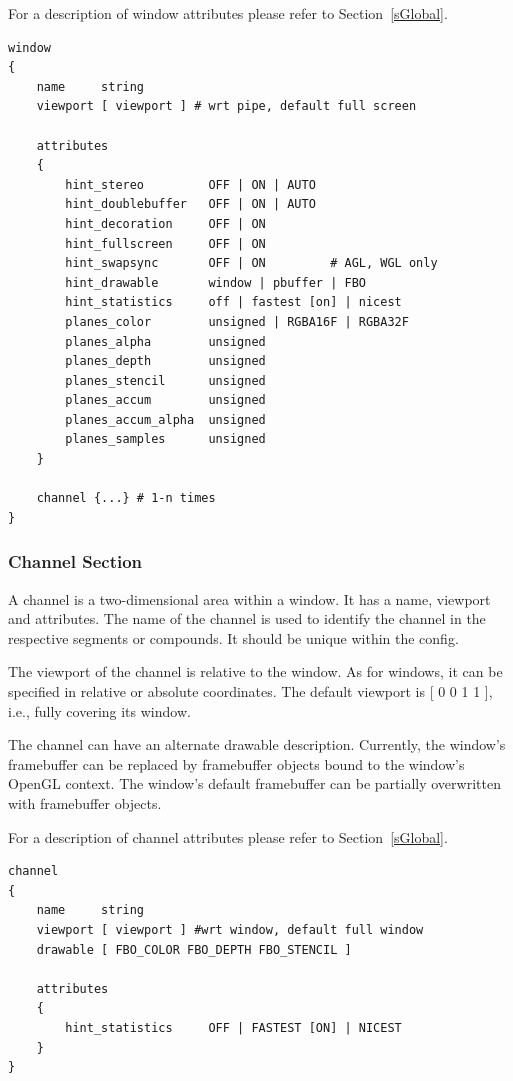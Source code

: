 \documentclass[10pt,a4]{scrartcl}
\newcommand{\sref}[1]{Section~\ref{#1}}
\begin{document}
For a description of window attributes please refer to \sref{sGlobal}.

{\footnotesize\begin{lstlisting}
window
{
    name     string
    viewport [ viewport ] # wrt pipe, default full screen

    attributes
    {
        hint_stereo         OFF | ON | AUTO
        hint_doublebuffer   OFF | ON | AUTO
        hint_decoration     OFF | ON
        hint_fullscreen     OFF | ON
        hint_swapsync       OFF | ON         # AGL, WGL only
        hint_drawable       window | pbuffer | FBO
        hint_statistics     off | fastest [on] | nicest
        planes_color        unsigned | RGBA16F | RGBA32F
        planes_alpha        unsigned
        planes_depth        unsigned
        planes_stencil      unsigned
        planes_accum        unsigned
        planes_accum_alpha  unsigned
        planes_samples      unsigned
    }

    channel {...} # 1-n times
}
\end{lstlisting}}

\subsubsection{Channel Section}

A channel is a two-dimensional area within a window. It has a name,
viewport and attributes. The name of the channel is used to identify the
channel in the respective segments or compounds. It should be unique
within the config.

The viewport of the channel is relative to the window. As for windows,
it can be specified in relative or absolute coordinates. The default
viewport is \textsf{[ 0 0 1 1 ]}, i.e., fully covering its window.

The channel can have an alternate drawable description. Currently, the
window's framebuffer can be replaced by framebuffer objects bound to the
window's OpenGL context. The window's default framebuffer can be
partially overwritten with framebuffer objects.

For a description of channel attributes please refer to \sref{sGlobal}.

{\footnotesize\begin{lstlisting}
channel
{
    name     string
    viewport [ viewport ] #wrt window, default full window
    drawable [ FBO_COLOR FBO_DEPTH FBO_STENCIL ]

    attributes
    {
        hint_statistics     OFF | FASTEST [ON] | NICEST
    }
}
\end{lstlisting}}
\end{document}
